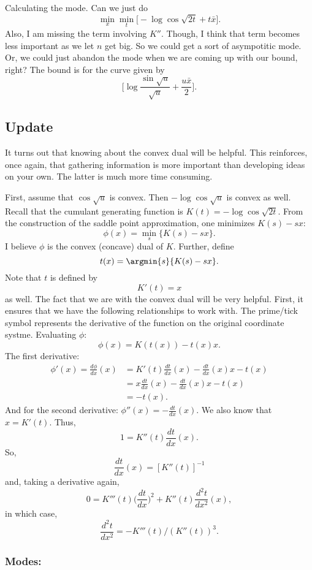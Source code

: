 \documentclass[12pt]{article}
\newcommand{\dd}[2]{\frac{d #1}{d #2}}
\begin{document}
Calculating the mode.  Can we just do
\[
\min_x \min_t \Big[ - \log \cos \sqrt{2t} + t \bar x \Big].
\]
Also, I am missing the term involving $K''$.  Though, I think that term becomes
less important as we let $n$ get big.  So we could get a sort of asympotitic
mode.  Or, we could just abandon the mode when we are coming up with our bound,
right?  The bound is for the curve given by
\[
\Big[ \log \frac{\sin \sqrt{u}}{\sqrt{u}} + \frac{u \bar x}{2} \Big].
\]

\subsection{Update}

It turns out that knowing about the convex dual will be helpful.  This
reinforces, once again, that gathering information is more important than
developing ideas on your own.  The latter is much more time consuming.

First, assume that $\cos{\sqrt{u}}$ is convex.  Then $-\log \cos{\sqrt{u}}$ is
convex as well.  Recall that the cumulant generating function is $K(t) = - \log
\cos \sqrt{2t}$.  From the construction of the saddle point approximation, one
minimizes $K(s) - sx$:
\[
\phi(x) = \min_s \{ K(s) - sx \}.
\]
I believe $\phi$ is the convex (concave) dual of $K$.  Further, define
\[
t(x) = \argmin{s} \{ K(s) - sx \}.
\]
Note that $t$ is defined by
\[
K'(t) = x
\]
as well.  The fact that we are with the convex dual will be very helpful.
First, it ensures that we have the following relationships to work with.  The
prime/tick symbol represents the derivative of the function on the original
coordinate systme.  Evaluating $\phi$:
\[
\phi(x) = K(t(x)) - t(x) x.
\]
The first derivative:
\begin{align*}
  \phi'(x) = \dd{\phi}{x}(x) & = K'(t) \dd{t}{x}(x) - \dd{t}{x}(x) x - t(x) \\
  & = x \dd{t}{x}(x) - \dd{t}{x}(x) x - t(x) \\
  & = -t(x).
\end{align*}
And for the second derivative: $\phi''(x) = -\dd{t}{x}(x)$.  We also know that
$x = K'(t)$.  Thus,
\[
1 = K''(t) \dd{t}{x} (x).
\]
So,
\[
\dd{t}{x}(x) = [K''(t)]^{-1}
\]
and, taking a derivative again,
\[
0 = K'''(t) \Big(\dd{t}{x}\Big)^2 + K''(t) \dd{^2 t}{x^2}(x),
\]
in which case,
\[
\dd{^2 t}{x^2} = - K'''(t) / (K''(t))^3.
\]

\subsubsection{Modes:}
\end{document}
